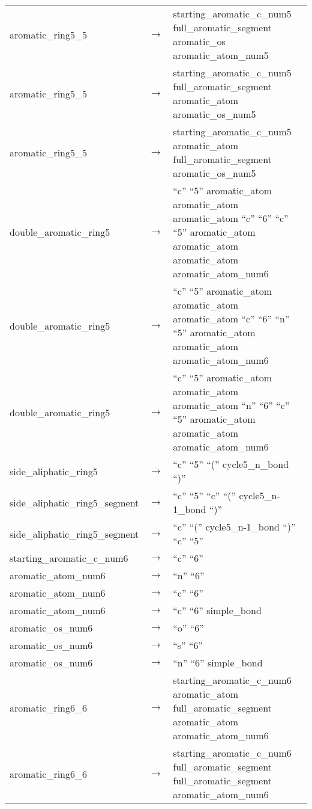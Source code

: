 \begin{longtable}{m{} p{} p{}}
    aromatic\_ring5\_5 & $\rightarrow$ & starting\_aromatic\_c\_num5 full\_aromatic\_segment aromatic\_os aromatic\_atom\_num5 \\
    aromatic\_ring5\_5 & $\rightarrow$ & starting\_aromatic\_c\_num5 full\_aromatic\_segment aromatic\_atom aromatic\_os\_num5 \\
    aromatic\_ring5\_5 & $\rightarrow$ & starting\_aromatic\_c\_num5 aromatic\_atom full\_aromatic\_segment aromatic\_os\_num5 \\
    double\_aromatic\_ring5 & $\rightarrow$ & ``c'' ``5'' aromatic\_atom aromatic\_atom aromatic\_atom ``c'' ``6'' ``c'' ``5'' aromatic\_atom aromatic\_atom aromatic\_atom aromatic\_atom\_num6 \\
    double\_aromatic\_ring5 & $\rightarrow$ & ``c'' ``5'' aromatic\_atom aromatic\_atom aromatic\_atom ``c'' ``6'' ``n'' ``5'' aromatic\_atom aromatic\_atom aromatic\_atom\_num6 \\
    double\_aromatic\_ring5 & $\rightarrow$ & ``c'' ``5'' aromatic\_atom aromatic\_atom aromatic\_atom ``n'' ``6'' ``c'' ``5'' aromatic\_atom aromatic\_atom aromatic\_atom\_num6 \\
    side\_aliphatic\_ring5 & $\rightarrow$ & ``c'' ``5'' ``('' cycle5\_n\_bond ``)'' \\
    side\_aliphatic\_ring5\_segment & $\rightarrow$ & ``c'' ``5'' ``c'' ``('' cycle5\_n-1\_bond ``)'' \\
    side\_aliphatic\_ring5\_segment & $\rightarrow$ & ``c'' ``('' cycle5\_n-1\_bond ``)'' ``c'' ``5'' \\
    starting\_aromatic\_c\_num6 & $\rightarrow$ & ``c'' ``6'' \\
    aromatic\_atom\_num6 & $\rightarrow$ & ``n'' ``6'' \\
    aromatic\_atom\_num6 & $\rightarrow$ & ``c'' ``6'' \\
    aromatic\_atom\_num6 & $\rightarrow$ & ``c'' ``6'' simple\_bond \\
    aromatic\_os\_num6 & $\rightarrow$ & ``o'' ``6'' \\
    aromatic\_os\_num6 & $\rightarrow$ & ``s'' ``6'' \\
    aromatic\_os\_num6 & $\rightarrow$ & ``n'' ``6'' simple\_bond \\
    aromatic\_ring6\_6 & $\rightarrow$ & starting\_aromatic\_c\_num6 aromatic\_atom full\_aromatic\_segment aromatic\_atom aromatic\_atom\_num6 \\
    aromatic\_ring6\_6 & $\rightarrow$ & starting\_aromatic\_c\_num6 full\_aromatic\_segment full\_aromatic\_segment aromatic\_atom\_num6 \\

\end{longtable}
